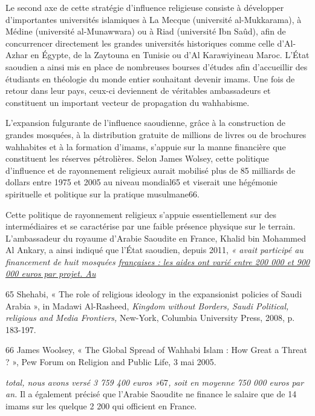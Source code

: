 Le second axe de cette stratégie d'influence religieuse consiste à
développer d'importantes universités islamiques à La Mecque (université
al-Mukkarama), à Médine (université al-Munawwara) ou à Riad (université
Ibn Saûd), afin de concurrencer directement les grandes universités
historiques comme celle d'Al-Azhar en Égypte, de la Zaytouna en Tunisie
ou d'Al Karawiyineau Maroc. L'État saoudien a ainsi mis en place de
nombreuses bourses d'études afin d'accueillir des étudiants en théologie
du monde entier souhaitant devenir imams. Une fois de retour dans leur
pays, ceux-ci deviennent de véritables ambassadeurs et constituent un
important vecteur de propagation du wahhabisme.

L'expansion fulgurante de l'influence saoudienne, grâce à la
construction de grandes mosquées, à la distribution gratuite de millions
de livres ou de brochures wahhabites et à la formation d'imams, s'appuie
sur la manne financière que constituent les réserves pétrolières. Selon
James Wolsey, cette politique d'influence et de rayonnement religieux
aurait mobilisé plus de 85 milliards de dollars entre 1975 et 2005 au
niveau mondial65 et viserait une hégémonie spirituelle et politique sur
la pratique musulmane66.

Cette politique de rayonnement religieux s'appuie essentiellement sur
des intermédiaires et se caractérise par une faible présence physique
sur le terrain. L'ambassadeur du royaume d'Arabie Saoudite en France,
Khalid bin Mohammed Al Ankary, a ainsi indiqué que l'État saoudien,
depuis 2011, \emph{« avait participé au financement de huit mosquées
\underline{françaises : les aides ont varié entre 200 000 et 900 000
euros par projet. Au}}

65 Shehabi, « The role of religious ideology in the expansionist
policies of Saudi Arabia », in Madawi Al-Rasheed, \emph{Kingdom without
Borders, Saudi Political, religious and Media Frontiers,} New-York,
Columbia University Press, 2008, p. 183-197.

66 James Woolsey, « The Global Spread of Wahhabi Islam : How Great a
Threat ? », Pew Forum on Religion and Public Life, 3 mai 2005.



\emph{total, nous avons versé 3 759 400 euros »}67\emph{, soit en
moyenne 750 000 euros par an.} Il a également précisé que l'Arabie
Saoudite ne finance le salaire que de 14 imams sur les quelque 2 200 qui
officient en France.




